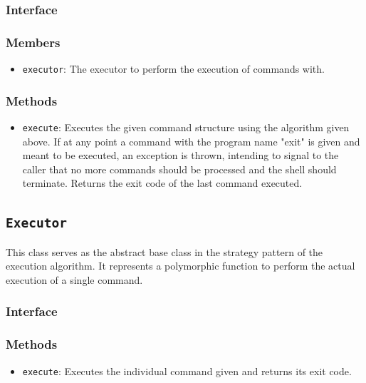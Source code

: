 \documentclass{article}
\begin{document}
  \subsubsection{Interface}
  

  \subsubsection{Members}
  \begin{itemize}
    \item \texttt{executor}: The executor to perform the execution of
      commands with.
  \end{itemize}

  \subsubsection{Methods}
  \begin{itemize}
    \item \texttt{execute}: Executes the given command structure using
      the algorithm given above.  If at any point a command with the
      program name "exit" is given and meant to be executed, an
      exception is thrown, intending to signal to the caller that no
      more commands should be processed and the shell should terminate.
      Returns the exit code of the last command executed.
  \end{itemize}

  \subsection{\texttt{Executor}}

  This class serves as the abstract base class in the strategy pattern
  of the execution algorithm.  It represents a polymorphic function to
  perform the actual execution of a single command.

  \subsubsection{Interface}
  

  \subsubsection{Methods}
  \begin{itemize}
    \item \texttt{execute}: Executes the individual command given and
      returns its exit code.
  \end{itemize}
\end{document}
